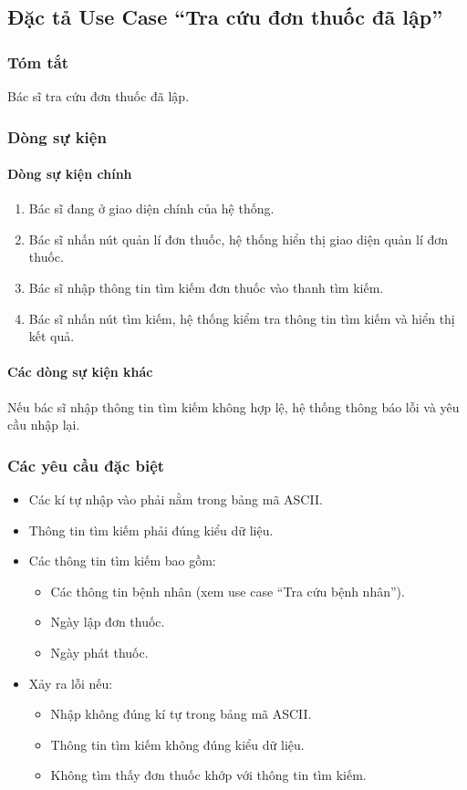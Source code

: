 \subsection{Đặc tả Use Case ``Tra cứu đơn thuốc đã lập''}

\subsubsection{Tóm tắt}
Bác sĩ tra cứu đơn thuốc đã lập.

\subsubsection{Dòng sự kiện}
\paragraph{\textbf{Dòng sự kiện chính}}
\begin{enumerate}
  \item Bác sĩ đang ở giao diện chính của hệ thống.
  \item Bác sĩ nhấn nút quản lí đơn thuốc, hệ thống hiển thị giao diện quản lí đơn thuốc.
  \item Bác sĩ nhập thông tin tìm kiếm đơn thuốc vào thanh tìm kiếm.
  \item Bác sĩ nhấn nút tìm kiếm, hệ thống kiểm tra thông tin tìm kiếm và hiển thị kết quả.
\end{enumerate}

\paragraph{\textbf{Các dòng sự kiện khác}}
Nếu bác sĩ nhập thông tin tìm kiếm không hợp lệ, hệ thống thông báo lỗi và yêu cầu nhập lại.

\subsubsection{Các yêu cầu đặc biệt}
\begin{itemize}
  \item Các kí tự nhập vào phải nằm trong bảng mã ASCII.
  \item Thông tin tìm kiếm phải đúng kiểu dữ liệu.
  \item Các thông tin tìm kiếm bao gồm:
    \begin{itemize}
      \item Các thông tin bệnh nhân (xem use case ``Tra cứu bệnh nhân'').
      \item Ngày lập đơn thuốc.
      \item Ngày phát thuốc.
    \end{itemize}
  \item Xảy ra lỗi nếu:
    \begin{itemize}
      \item Nhập không đúng kí tự trong bảng mã ASCII.
      \item Thông tin tìm kiếm không đúng kiểu dữ liệu.
      \item Không tìm thấy đơn thuốc khớp với thông tin tìm kiếm.
    \end{itemize}
\end{itemize}

